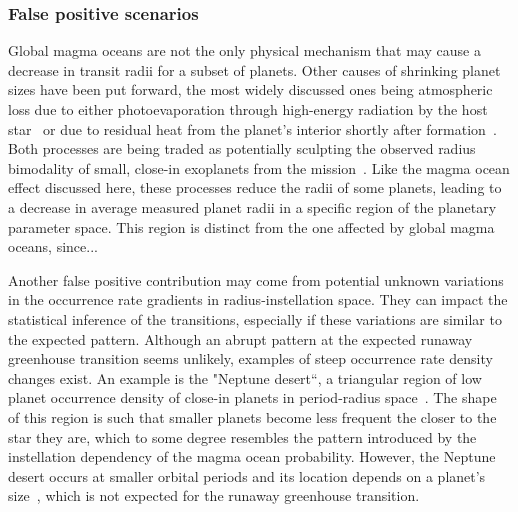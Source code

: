 \documentclass[modern]{aastex631}
\begin{document}
\subsubsection{False positive scenarios}
\begin{note}
    Global magma oceans are not the only physical mechanism that may cause a decrease in transit radii for a subset of planets.
    Other causes of shrinking planet sizes have been put forward, the most widely discussed ones being atmospheric loss due to either photoevaporation through high-energy radiation by the host star~\citep[e.g.,][]{Owen2013,Jin2014,Mordasini2020a} or due to residual heat from the planet's interior shortly after formation~\citep{Ginzburg2016b,Ginzburg2018,Gupta2019}.
    Both processes are being traded as potentially sculpting the observed radius bimodality of small, close-in exoplanets from the  mission~\citep{Fulton2017,VanEylen2018}.
    Like the magma ocean effect discussed here, these processes reduce the radii of some planets, leading to a decrease in average measured planet radii in a specific region of the planetary parameter space.
    This region is distinct from the one affected by global magma oceans, since... 

    Another false positive contribution may come from potential unknown variations in the occurrence rate gradients in radius-instellation space.
    They can impact the statistical inference of the transitions, especially if these variations are similar to the expected pattern.
    Although an abrupt pattern at the expected runaway greenhouse transition seems unlikely, examples of steep occurrence rate density changes exist.
    An example is the "Neptune desert``, a triangular region of low planet occurrence density of close-in planets in period-radius space~\citep{Szabo2011,Mazeh2016,Dreizler2020b}.
    The shape of this region is such that smaller planets become less frequent the closer to the star they are, which to some degree resembles the pattern introduced by the instellation dependency of the magma ocean probability.
    However, the Neptune desert occurs at smaller orbital periods and its location depends on a planet's size~\citep{Szabo2011}, which is not expected for the runaway greenhouse transition.
\end{note}

\end{document}
